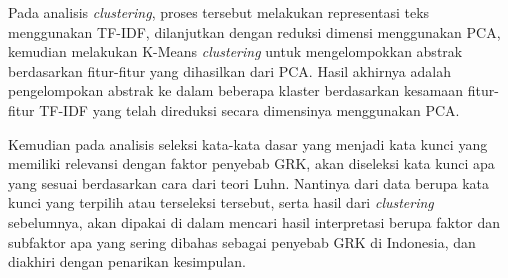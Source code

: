 Pada analisis \textit{clustering}, proses tersebut melakukan representasi teks menggunakan TF-IDF, dilanjutkan dengan reduksi dimensi menggunakan PCA, kemudian melakukan K-Means \textit{clustering} untuk mengelompokkan abstrak berdasarkan fitur-fitur yang dihasilkan dari PCA. Hasil akhirnya adalah pengelompokan abstrak ke dalam beberapa klaster berdasarkan kesamaan fitur-fitur TF-IDF yang telah direduksi secara dimensinya menggunakan PCA.

Kemudian pada analisis seleksi kata-kata dasar yang menjadi kata kunci yang memiliki relevansi dengan faktor penyebab GRK, akan diseleksi kata kunci apa 
yang sesuai berdasarkan cara dari teori Luhn. Nantinya dari data berupa kata kunci yang terpilih atau terseleksi tersebut, serta hasil dari \textit{clustering} sebelumnya, akan dipakai di dalam mencari hasil interpretasi berupa faktor dan subfaktor apa yang sering dibahas sebagai penyebab GRK di Indonesia, dan diakhiri dengan penarikan kesimpulan.